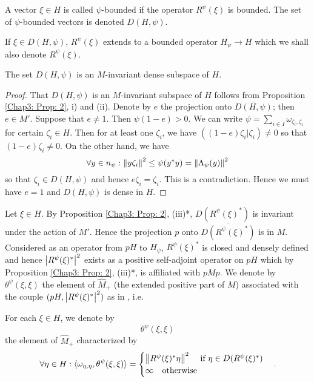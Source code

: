 \begin{definition}
    A vector $\xi\in H$ is called $\psi$-bounded if the operator $R^\psi(\xi)$ is bounded. The set of $\psi$-bounded vectors is denoted $D(H,\psi)$.
\end{definition}
\begin{notation}
    If $\xi\in D(H,\psi)$, $R^\psi(\xi)$ extends to a bounded operator $H_\psi\to H$ which we shall also denote $R^\psi(\xi)$.
\end{notation}
\begin{proposition}\label{Chap3: Prop: 4}
    The set $D(H,\psi)$ is an $M$-invariant dense subspace
    of $H$.
\end{proposition}
\begin{proof}
    That $D(H,\psi)$ is an $M$-invariant subspace of $H$ follows from Proposition \ref{Chap3: Prop: 2}, i) and (ii). Denote by $e$ the projection onto $\overline{D(H,\psi)}$; then $e\in M'$. Suppose that $e\neq 1$. Then $\psi(1-e)>0$. We can write $\psi=\sum_{i\in I}\omega_{\zeta_i,\zeta_i}$ for certain $\zeta_i\in H$. Then for at least one $\zeta_i$, we have $((1-e)\zeta_i|\zeta_i)\neq 0$ so that $(1-e)\zeta_i\neq 0$. On the other hand, we have
    \[
        \forall y\in n_\psi:\norm{y\zeta_i}^2\leq \psi(y^*y)=\norm{\Lambda_\psi(y)}^2
    \]
    so that $\zeta_i\in D(H,\psi)$ and hence $e\zeta_i = \zeta_i$. This is a contradiction. Hence we must have $e = 1$ and $D(H,\psi)$ is dense in $H$.
\end{proof}
Let $\xi\in H$. By Proposition \ref{Chap3: Prop: 2}, (iii)*, $D(R^\psi(\xi)^*)$ is invariant under the action of $M'$. Hence the projection $p$ onto $\overline{D(R^\psi(\xi)^*)}$ is in $M$. Considered as an operator from $pH$ to $H_\psi$, $R^\psi(\xi)^*$ is closed and densely defined and hence $\abs{R^\psi(\xi)^*}^2$ exists as a positive self-adjoint operator on $pH$ which by Proposition \ref{Chap3: Prop: 2}, (iii)*, is affiliated with $pMp$. We denote by $\theta^\psi(\xi,\xi)$ the element of $\widehat{M}_+$ (the extended positive part of $M$) associated with the couple $(pH,\abs{R^\psi(\xi)^*}^2)$ as in \cite[Example 1.2 and Lemma 1.4]{7}, i.e.
\begin{definition}\label{Chap3: Def: 5}
    For each $\xi\in H$, we denote by
    \[
        \theta^\psi(\xi,\xi)
    \]
    the element of $\widehat{M}_+$ characterized by
    \begin{equation}
        \forall \eta\in H: \langle\omega_{\eta,\eta},\theta^\psi(\xi,\xi)\rangle=\begin{cases}
            \norm{R^\psi(\xi)^*\eta}^2\quad \text{ if } \eta\in D(R^\psi(\xi)^*) \\
            \infty\quad \text{otherwise}
        \end{cases}.
    \end{equation}
\end{definition}
